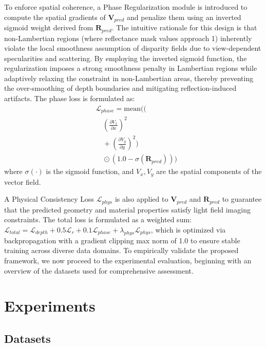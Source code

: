 \documentclass[lettersize,journal]{IEEEtran}
\begin{document}
To enforce spatial coherence, a Phase Regularization module is introduced to compute the spatial gradients of $\mathbf{V}_{pred}$ and penalize them using an inverted sigmoid weight derived from $\mathbf{R}_{pred}$. The intuitive rationale for this design is that non-Lambertian regions (where reflectance mask values approach 1) inherently violate the local smoothness assumption of disparity fields due to view-dependent specularities and scattering. By employing the inverted sigmoid function, the regularization imposes a strong smoothness penalty in Lambertian regions while adaptively relaxing the constraint in non-Lambertian areas, thereby preventing the over-smoothing of depth boundaries and mitigating reflection-induced artifacts. The phase loss is formulated as:
\begin{equation}
\begin{aligned}
&\mathcal{L}_{phase} = \text{mean} \Bigg( \Bigg( \\
&\quad \left(\frac{\partial V_x}{\partial x}\right)^2 \\
&\quad + \left(\frac{\partial V_y}{\partial y}\right)^2 \Bigg) \\
&\quad \odot (1.0 - \sigma(\mathbf{R}_{pred})) \Bigg)
\end{aligned}
\end{equation}
where $\sigma(\cdot)$ is the sigmoid function, and $V_x, V_y$ are the spatial components of the vector field. 

A Physical Consistency Loss $\mathcal{L}_{phys}$ is also applied to $\mathbf{V}_{pred}$ and $\mathbf{R}_{pred}$ to guarantee that the predicted geometry and material properties satisfy light field imaging constraints. The total loss is formulated as a weighted sum: $\mathcal{L}_{total} = \mathcal{L}_{depth} + 0.5\mathcal{L}_{r} + 0.1\mathcal{L}_{phase} + \lambda_{phys}\mathcal{L}_{phys}$, which is optimized via backpropagation with a gradient clipping max norm of 1.0 to ensure stable training across diverse data domains. To empirically validate the proposed framework, we now proceed to the experimental evaluation, beginning with an overview of the datasets used for comprehensive assessment.

\section{Experiments}

\subsection{Datasets}
\end{document}
